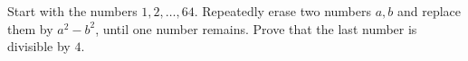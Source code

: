 Start with the numbers $1,2,\ldots,64$. Repeatedly erase two numbers $a,b$ and replace them by $a^2-b^2$, until one number remains. Prove that the last number is divisible by $4$.
